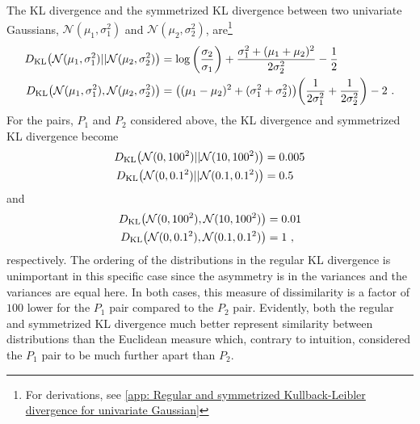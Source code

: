 The \gls{KL} divergence and the symmetrized \gls{KL} divergence between two univariate Gaussians, $\mathcal{N}(\mu_1,\sigma_1^2)$ and $\mathcal{N}(\mu_2,\sigma_2^2)$, are\footnote{For derivations, see \autoref{app: Regular and symmetrized Kullback-Leibler divergence for univariate Gaussian}}
\begin{align}
    D_\text{KL}{\left(\mathcal{N}(\mu_1,\sigma_1^2) || \mathcal{N}(\mu_2,\sigma_2^2)\right)} &= \log{\left(\frac{\sigma_2}{\sigma_1}\right)} + \frac{\sigma_1^2+(\mu_1+\mu_2)^2}{2\sigma_2^2} - \frac{1}{2}\\
    D_\text{KL}{\left(\mathcal{N}(\mu_1,\sigma_1^2), \mathcal{N}(\mu_2,\sigma_2^2)\right)} &= {\left((\mu_1-\mu_2)^2 + (\sigma_1^2 + \sigma_2^2)\right)}{\left(\frac{1}{2\sigma_1^2} + \frac{1}{2\sigma_2^2}\right)} - 2 \ .
\end{align}
For the pairs, $P_1$ and $P_2$ considered above, the \gls{KL} divergence and symmetrized \gls{KL} divergence become
\begin{align}
    D_\text{KL}{\left(\mathcal{N}(0,100^2)||\mathcal{N}(10,100^2)\right)} &= 0.005\nonumber\\
    D_\text{KL}{\left(\mathcal{N}(0,0.1^2)||\mathcal{N}(0.1,0.1^2)\right)} &= 0.5\nonumber
\end{align}
and
\begin{align}
    D_\text{KL}{\left(\mathcal{N}(0,100^2), \mathcal{N}(10,100^2)\right)} &= 0.01\nonumber\\
    D_\text{KL}{\left(\mathcal{N}(0,0.1^2), \mathcal{N}(0.1,0.1^2)\right)} &= 1\nonumber \ ,
\end{align}
respectively. The ordering of the distributions in the regular \gls{KL} divergence is unimportant in this specific case since the asymmetry is in the variances and the variances are equal here. In both cases, this measure of dissimilarity is a factor of $100$ lower for the $P_1$ pair compared to the $P_2$ pair. Evidently, both the regular and symmetrized \gls{KL} divergence much better represent similarity between distributions than the Euclidean measure which, contrary to intuition, considered the $P_1$ pair to be much further apart than $P_2$.


